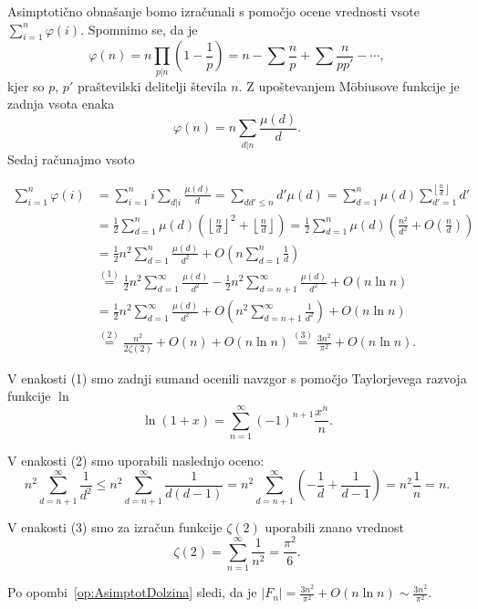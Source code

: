 \documentclass[mat1]{fmfdelo}
\begin{document}
\begin{dokaz}
Asimptotično obnašanje bomo izračunali s pomočjo ocene vrednosti vsote \( \sum_{i=1}^n \varphi(i) \).
Spomnimo se, da je \[ \varphi(n) = n \prod_{p|n} \left (1 - \frac{1}{p} \right ) = n - \sum \frac{n}{p} + \sum \frac{n}{pp'} - \cdots , \]
kjer so $p$, $p'$ praštevilski delitelji števila $n$.  Z upoštevanjem M\"obiusove funkcije je zadnja vsota enaka
\[ \varphi(n) = n \sum_{d|n} \frac{\mu(d)}{d} .\]
Sedaj računajmo vsoto 

\begin{align*}
\sum_{i=1}^n \varphi(i)
  &= \sum_{i=1}^n i \sum_{d|i} \frac{\mu(d)}{d} = \sum_{dd'\leq n}d' \mu(d) = 
    \sum_{d=1}^n \mu(d) \sum_{d'=1}^{\left \lfloor \frac{n}{d} \right \rfloor} d' \\
  &= \frac{1}{2} \sum_{d=1}^{n} \mu(d) \left (\left \lfloor \frac{n}{d} \right \rfloor ^2 + \left \lfloor \frac{n}{d} \right \rfloor \right) =
    \frac{1}{2} \sum_{d=1}^{n} \mu(d) \left (\frac{n^2}{d^2} + O \left (\frac{n}{d} \right) \right) \\
  &= \frac{1}{2}n^2 \sum_{d=1}^{n} \frac{\mu(d)}{d^2} + O \left (n \sum_{d=1}^{n} \frac{1}{d} \right ) \\
  &\stackrel{(1)}{=} \frac{1}{2}n^2 \sum_{d=1}^{\infty} \frac{\mu(d)}{d^2} - \frac{1}{2}n^2 \sum_{d=n+1}^{\infty} \frac{\mu(d)}{d^2} + O(n \ln{n}) \\
  &= \frac{1}{2}n^2 \sum_{d=1}^{\infty} \frac{\mu(d)}{d^2} + O \left (n^2\sum_{d=n+1}^{\infty} \frac{1}{d^2} \right ) + O(n \ln{n}) \\
  & \stackrel{(2)}{=} \frac{n^2}{2 \zeta(2)} + O(n) + O(n \ln{n}) \stackrel{(3)}{=} \frac{3n^2}{\pi^2} + O(n \ln{n}).
\end{align*}

V enakosti (1) smo zadnji sumand ocenili navzgor s pomočjo Taylorjevega razvoja funkcije $\ln$
\[ \ln{(1+x)} = \sum_{n=1}^{\infty} (-1)^{n+1} \frac{x^n}{n}.\]

V enakosti (2) smo uporabili naslednjo oceno:
\[ n^2 \sum_{d=n+1}^{\infty} \frac{1}{d^2} \leq n^2 \sum_{d=n+1}^{\infty} \frac{1}{d(d-1)} = 
n^2 \sum_{d=n+1}^{\infty} \left (- \frac{1}{d} + \frac{1}{d-1} \right ) = n^2 \frac{1}{n} = n.\]

V enakosti (3) smo za izračun funkcije $\zeta(2)$ uporabili znano vrednost
\[ \zeta(2) = \sum_{n=1}^{\infty} \frac{1}{n^2} = \frac{\pi^2}{6}.\]

Po opombi~\ref{op:AsimptotDolzina} sledi, da je \(|F_n| = \frac{3n^2}{\pi^2} + O(n \ln{n}) \sim\frac{3n^2}{\pi^2}. \)
 
\end{dokaz}
\end{document}

